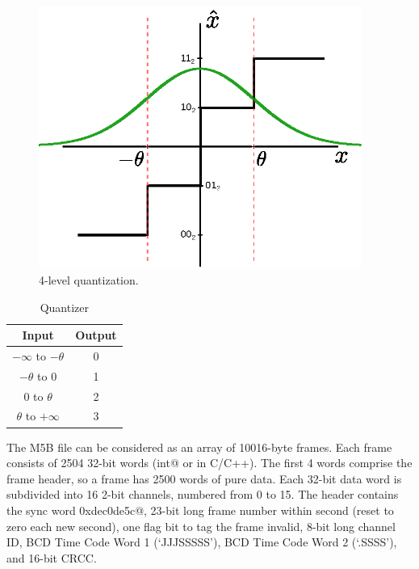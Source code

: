\documentclass[letterpaper,twoside,12pt]{article}
\begin{document}
\begin{figure}[h!]
  \begin{center}
  \includegraphics[width=25pc]{fig_4_Level_Quantization_Pattern_impr.eps}
  \caption{4-level quantization.}
  \label{quant4lvl}
  \end{center}
\end{figure}


\begin{table}[h!]
  \begin{center}
    \caption{Quantizer}
    \label{quant_io}
    \begin{tabular}{c|c}
      \textbf{Input} & \textbf{Output} \\
      \hline
      $-\infty$ to $-\theta$ & 0 \\
      $-\theta$ to 0         & 1 \\
      0 to $\theta$          & 2 \\
      $\theta$ to $+\infty$  & 3 \\
    \end{tabular}
  \end{center}
\end{table}


The M5B file can be considered as an array of 10016-byte frames. Each frame consists of 2504 32-bit words (\verb@unsigned int@ or  \verb@uint@ in C/C++). The first 4 words comprise the frame header, so a frame has 2500 words of pure data. Each 32-bit data word is subdivided into 16 2-bit channels, numbered from 0 to 15. The header contains the sync word \verb@0xdec0de5c@, 23-bit long frame number within second (reset to zero each new second), one flag bit to tag the frame invalid, 8-bit long channel ID, BCD Time Code Word 1 (‘JJJSSSSS’), BCD Time Code Word 2 (‘.SSSS’), and  16-bit CRCC.
\end{document}
